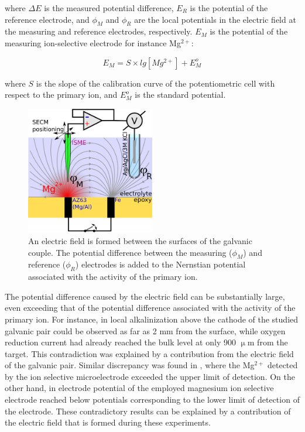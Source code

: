 where $\Delta E$ is the measured potential difference, $E_R$ is the potential of the reference electrode, and $\phi_M$ and $\phi_R$ are the local potentials in the electric field at the measuring and reference electrodes, respectively. $E_M$ is the potential of the measuring ion-selective electrode for instance Mg$^{2+}$:

\begin{equation}
E_M = S \times lg[Mg^{2+}] + E_M^o
\label{eq:measuring}
\end{equation}

where $S$ is the slope of the calibration curve of the potentiometric cell with respect to the primary ion, and $E_M^o$ is the standard potential.

\begin{figure}[b]
\centering
\includegraphics[width=0.5\textwidth]{img/field/field.eps}
\caption{An electric field is formed between the surfaces of the galvanic couple. The potential difference between the measuring ($\phi_M$) and reference ($\phi_R$) electrodes is added to the Nernstian potential associated with the activity of the primary ion.}
\label{fig:field}
\end{figure}

The potential difference caused by the electric field can be substantially large, even exceeding that of the potential difference associated with the activity of the primary ion.
For instance, in \cite{11} local alkalinization above the cathode of the studied galvanic pair could be observed as far as 2 mm from the surface, while oxygen reduction current had already reached the bulk level at only 900 $\upmu$m from the target.
This contradiction was explained by a contribution from the electric field of the galvanic pair.
Similar discrepancy was found in \cite{12, 13, 14}, where the Mg$^{2+}$ detected by the ion selective microelectrode exceeded the upper limit of detection. On the other hand, in \cite{15} electrode potential of the employed magnesium ion selective electrode reached below potentials corresponding to the lower limit of detection of the electrode. These contradictory results can be explained by a contribution of the electric field that is formed during these experiments. 

